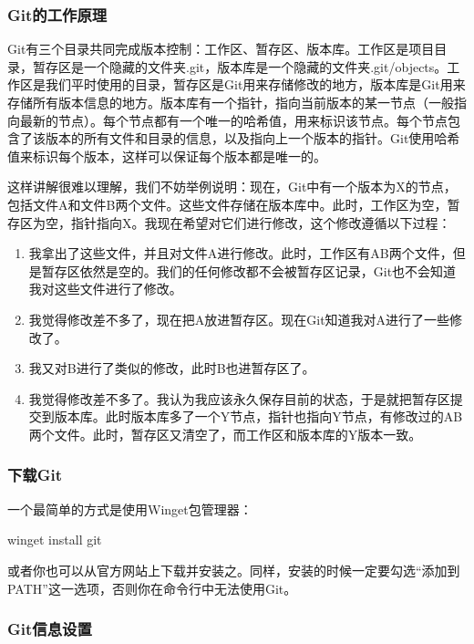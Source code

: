 \documentclass[12pt]{report}
\begin{document}
\subsubsection{Git的工作原理}

Git有三个目录共同完成版本控制：工作区、暂存区、版本库。工作区是项目目录，暂存区是一个隐藏的文件夹.git，版本库是一个隐藏的文件夹.git/objects。工作区是我们平时使用的目录，暂存区是Git用来存储修改的地方，版本库是Git用来存储所有版本信息的地方。版本库有一个指针，指向当前版本的某一节点（一般指向最新的节点）。每个节点都有一个唯一的哈希值，用来标识该节点。每个节点包含了该版本的所有文件和目录的信息，以及指向上一个版本的指针。Git使用哈希值来标识每个版本，这样可以保证每个版本都是唯一的。

这样讲解很难以理解，我们不妨举例说明：现在，Git中有一个版本为X的节点，包括文件A和文件B两个文件。这些文件存储在版本库中。此时，工作区为空，暂存区为空，指针指向X。我现在希望对它们进行修改，这个修改遵循以下过程：

\begin{enumerate}
    \item 我拿出了这些文件，并且对文件A进行修改。此时，工作区有AB两个文件，但是暂存区依然是空的。我们的任何修改都不会被暂存区记录，Git也不会知道我对这些文件进行了修改。
    \item 我觉得修改差不多了，现在把A放进暂存区。现在Git知道我对A进行了一些修改了。
    \item 我又对B进行了类似的修改，此时B也进暂存区了。
    \item 我觉得修改差不多了。我认为我应该永久保存目前的状态，于是就把暂存区提交到版本库。此时版本库多了一个Y节点，指针也指向Y节点，有修改过的AB两个文件。此时，暂存区又清空了，而工作区和版本库的Y版本一致。
\end{enumerate}

\subsubsection{下载Git}

一个最简单的方式是使用Winget包管理器：

\begin{codebox}[title=Windows下安装Git]
    winget install git
\end{codebox}

或者你也可以从官方网站上下载并安装之。同样，安装的时候一定要勾选“添加到PATH”这一选项，否则你在命令行中无法使用Git。

\subsubsection{Git信息设置}
\end{document}
